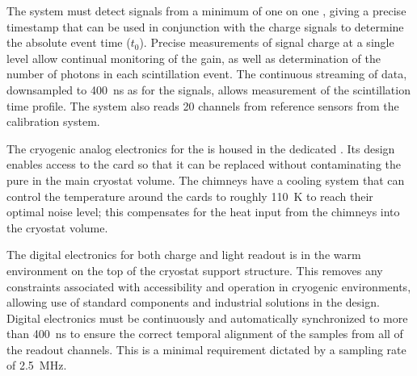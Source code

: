 The   system must detect signals from a minimum of one \phel on one , giving a precise timestamp that can be used in conjunction with the charge signals to determine the absolute event time ($t_0$). Precise measurements of  signal charge at a single \phel level allow continual monitoring of the  gain, as well as determination of the number of photons in each scintillation event. 
The continuous  streaming of data, downsampled to \SI{400}{ns} as for the  signals, allows measurement of the scintillation time profile. The  system also reads \num{20} channels from reference   sensors from the  calibration system.


The cryogenic analog electronics for the  is housed in the dedicated . Its design enables access to the  card so that it can be replaced without contaminating the pure \lar in the main cryostat volume. The chimneys have a cooling system that can control the temperature around the  cards to roughly \SI{110}{\kelvin} to reach their optimal noise level; this compensates for the heat input from the chimneys into the cryostat volume. 

The digital electronics for both charge and light readout is in the warm environment on the top of the cryostat support structure. %
This removes any constraints associated with  accessibility and operation in cryogenic environments, allowing use of standard components and industrial solutions in the design. Digital electronics must be continuously and automatically synchronized to more than \SI{400}{\nano\s} to ensure the correct temporal alignment of the  samples from all of the readout channels. This is a minimal requirement dictated by a sampling rate of \SI{2.5}{\MHz}.  

